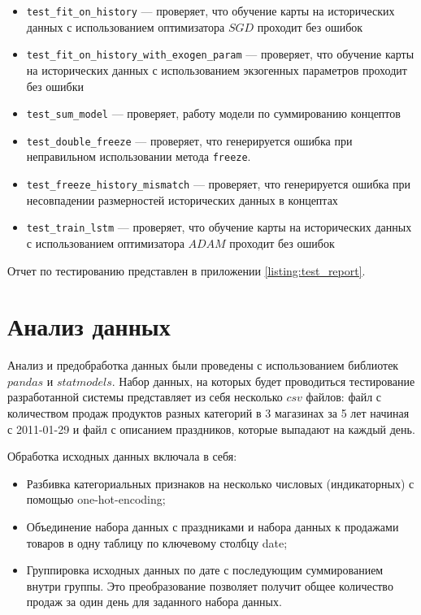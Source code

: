 \begin{itemize}
	\item \verb|test_fit_on_history| --- проверяет, что обучение карты на исторических данных с использованием оптимизатора $ SGD $ проходит без ошибок
	\item \verb|test_fit_on_history_with_exogen_param| --- проверяет, что обучение карты на исторических данных с использованием экзогенных параметров проходит без ошибки
	\item \verb|test_sum_model| --- проверяет, работу модели по суммированию концептов
	\item \verb|test_double_freeze| --- проверяет, что генерируется ошибка при неправильном использовании метода \verb|freeze|.
	\item \verb|test_freeze_history_mismatch| --- проверяет, что генерируется ошибка при несовпадении размерностей исторических данных в концептах
	\item \verb|test_train_lstm| --- проверяет, что обучение карты на исторических данных с использованием оптимизатора $ ADAM $ проходит без ошибок
\end{itemize}

Отчет по тестированию представлен в приложении \ref{listing:test_report}.

\section{Анализ данных}

Анализ и предобработка данных были проведены с использованием
библиотек $ pandas $ и $ statmodels $.
Набор данных, на которых будет проводиться тестирование разработанной системы
представляет из себя несколько $ csv $ файлов: файл с количеством продаж
продуктов разных категорий в 3 магазинах за 5 лет начиная с 2011-01-29
и файл с описанием праздников, которые выпадают на каждый день.

Обработка исходных данных включала в себя:

\begin{itemize}
	\item Разбивка категориальных признаков на несколько числовых (индикаторных) с помощью one-hot-encoding; %
	\item Объединение набора данных с праздниками и набора данных к продажами товаров в одну таблицу по ключевому столбцу date;
	\item Группировка исходных данных по дате с последующим суммированием  внутри группы. Это преобразование
	позволяет получит общее количество продаж за один день для заданного набора данных.
\end{itemize}

